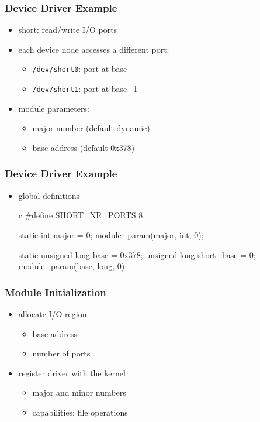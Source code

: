 \documentclass[dvipsnames]{beamer}
\begin{document}
\begin{frame}
  \frametitle{Device Driver Example}

  \begin{itemize}
    \item short: read/write I/O ports
    \item each device node accesses a different port:
    \begin{itemize}
      \item \texttt{/dev/short0}: port at base
      \item \texttt{/dev/short1}: port at base+1
    \end{itemize}

    \pause
    \medskip
    \item module parameters:
    \begin{itemize}
      \item major number (default dynamic)
      \item base address (default 0x378)
    \end{itemize}
  \end{itemize}
\end{frame}

\begin{frame}[fragile]
  \frametitle{Device Driver Example}

  \begin{itemize}
    \item global definitions

    \medskip
    \begin{pygments}{c}
#define SHORT_NR_PORTS 8

static int major = 0;
module_param(major, int, 0);

static unsigned long base = 0x378;
unsigned long short_base = 0;
module_param(base, long, 0);
    \end{pygments}
  \end{itemize}
\end{frame}

\begin{frame}
  \frametitle{Module Initialization}

  \begin{itemize}
    \item allocate I/O region
    \begin{itemize}
      \item base address
      \item number of ports
    \end{itemize}

    \pause
    \medskip
    \item register driver with the kernel
    \begin{itemize}
      \item major and minor numbers
      \item capabilities: file operations
    \end{itemize}
  \end{itemize}
\end{frame}
\end{document}
